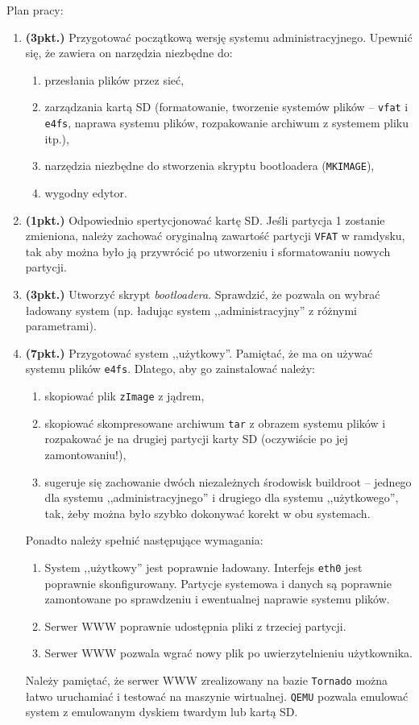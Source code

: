 \documentclass{article}
\begin{document}
Plan pracy:
\begin{enumerate}
	\item \textbf{(3pkt.)} Przygotować początkową wersję systemu administracyjnego. Upewnić się, że zawiera on narzędzia niezbędne do:
	\begin{enumerate}
		\item przesłania plików przez sieć,
		\item zarządzania kartą SD (formatowanie, tworzenie systemów plików -- \texttt{vfat} i \texttt{e4fs}, naprawa systemu plików, rozpakowanie archiwum z systemem pliku itp.),
		\item narzędzia niezbędne do stworzenia skryptu bootloadera (\texttt{MKIMAGE}),
		\item wygodny edytor.
	\end{enumerate}
	\item \textbf{(1pkt.)} Odpowiednio spertycjonować kartę SD. Jeśli partycja 1 zostanie zmieniona, należy zachować oryginalną zawartość partycji \texttt{VFAT} w ramdysku, tak aby można było ją przywrócić po utworzeniu i sformatowaniu nowych partycji.
	\item \textbf{(3pkt.)} Utworzyć skrypt \emph{bootloadera}. Sprawdzić, że pozwala on wybrać ładowany system (np. ładując system ,,administracyjny'' z różnymi parametrami).
	\item \textbf{(7pkt.)} Przygotować system ,,użytkowy''. Pamiętać, że ma on używać systemu plików \texttt{e4fs}. Dlatego, aby go zainstalować należy:
		\begin{enumerate}
			\item skopiować plik \texttt{zImage} z jądrem,
			\item skopiować skompresowane archiwum \texttt{tar} z obrazem systemu plików i rozpakować je na drugiej partycji karty SD (oczywiście po jej zamontowaniu!),
			\item sugeruje się zachowanie dwóch niezależnych środowisk buildroot -- jednego dla systemu ,,administracyjnego'' i drugiego dla systemu ,,użytkowego'', tak, żeby można było szybko dokonywać korekt w obu systemach.
		\end{enumerate}
		Ponadto należy spełnić następujące wymagania:
		\begin{enumerate}
			\item System ,,użytkowy'' jest poprawnie ładowany. Interfejs \texttt{eth0} jest poprawnie skonfigurowany. Partycje systemowa i danych są poprawnie zamontowane po sprawdzeniu i ewentualnej naprawie systemu plików.
			\item Serwer WWW poprawnie udostępnia pliki z trzeciej partycji.
			\item Serwer WWW pozwala wgrać nowy plik po uwierzytelnieniu użytkownika.
		\end{enumerate}
		Należy pamiętać, że serwer WWW zrealizowany na bazie \texttt{Tornado} można łatwo uruchamiać i testować na maszynie wirtualnej. \texttt{QEMU} pozwala emulować system z emulowanym dyskiem twardym lub kartą SD.
\end{enumerate}
\end{document}

